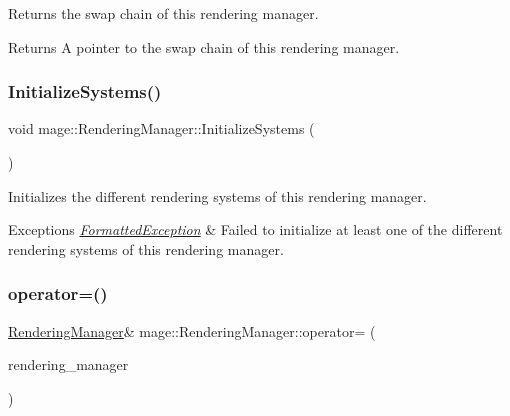 Returns the swap chain of this rendering manager.

\begin{DoxyReturn}{Returns}
A pointer to the swap chain of this rendering manager. 
\end{DoxyReturn}
\hypertarget{classmage_1_1_rendering_manager_a80812ecd5c9757b961e46e6bb7533566}{}\label{classmage_1_1_rendering_manager_a80812ecd5c9757b961e46e6bb7533566} 
\subsubsection{\texorpdfstring{Initialize\+Systems()}{InitializeSystems()}}
{\footnotesize\ttfamily void mage\+::\+Rendering\+Manager\+::\+Initialize\+Systems (\begin{DoxyParamCaption}{ }\end{DoxyParamCaption})\hspace{0.3cm}{\ttfamily [private]}}

Initializes the different rendering systems of this rendering manager.


\begin{DoxyExceptions}{Exceptions}
{\em \hyperlink{classmage_1_1_formatted_exception}{Formatted\+Exception}} & Failed to initialize at least one of the different rendering systems of this rendering manager. \\
\hline
\end{DoxyExceptions}
\hypertarget{classmage_1_1_rendering_manager_af34a5ba3b8b585124f84f4c70866546b}{}\label{classmage_1_1_rendering_manager_af34a5ba3b8b585124f84f4c70866546b} 
\subsubsection{\texorpdfstring{operator=()}{operator=()}\hspace{0.1cm}{\footnotesize\ttfamily [1/2]}}
{\footnotesize\ttfamily \hyperlink{classmage_1_1_rendering_manager}{Rendering\+Manager}\& mage\+::\+Rendering\+Manager\+::operator= (\begin{DoxyParamCaption}\item[{const \hyperlink{classmage_1_1_rendering_manager}{Rendering\+Manager} \&}]{rendering\+\_\+manager }\end{DoxyParamCaption})\hspace{0.3cm}{\ttfamily [delete]}}

